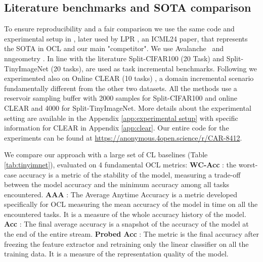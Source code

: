 \subsection{Literature benchmarks and SOTA comparison}
To ensure reproducibility and a fair comparison we use the same code and experimental setup in \cite{DBLP:conf/iccvw/Soutif-Cormerais23}, later used by  LPR \cite{yoo2024layerwise}, an ICML24 paper, that represents the SOTA in OCL and our main "competitor". We use Avalanche~\cite{carta2023avalanche} and nngeometry \cite{george_nngeometry}. In line with the literature Split-CIFAR100 (20 Task) and Split-TinyImageNet (20 tasks), are used as task incremental benchmarks. Following \cite{yoo2024layerwise} we experimented also on Online CLEAR (10 tasks) \cite{lin2021clear}, a domain incremental scenario fundamentally different from the other two datasets. 
All the methods use a reservoir sampling buffer with 2000 samples for Split-CIFAR100 and online CLEAR and 4000 for Split-TinyImageNet. More details about the experimental setting are available in the Appendix \ref{app:experimental setup} with specific information for CLEAR in Appendix \ref{app:clear}. Our entire code for the experiments can be found at \url{https://anonymous.4open.science/r/CAR-8412}.

We compare our approach with a large set of CL baselines (Table \ref{tab:tinyimnet}), evaluated on 4 fundamental OCL metrics: 
\textbf{WC-Acc} \cite{lirias4071238}: the worst-case accuracy is a metric of the stability of the model, measuring a trade-off between the model accuracy and the minimum accuracy among all tasks encountered. 
\textbf{AAA} \cite{DBLP:conf/iclr/CacciaAATPB22}: The Average Anytime Accuracy is a metric developed specifically for OCL measuring the mean accuracy of the model in time on all the encountered tasks. It is a measure of the whole accuracy history of the model.
 \textbf{Acc} \cite{DBLP:conf/nips/Lopez-PazR17}: The final average accuracy is a snapshot of the accuracy of the model at the end of the entire stream. 
\textbf{Probed Acc} \cite{davari2022probing}: The metric is the final accuracy after freezing the feature extractor and retraining only the linear classifier on all the training data. It is a measure of the representation quality of the model. 


